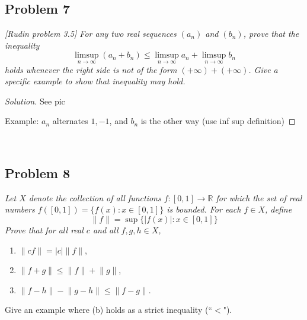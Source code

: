 \documentclass{article}
\newcommand{\R}{{\mathbb R}}
\begin{document}
\subsection*{Problem 7}
{\it [Rudin problem 3.5]
For any two real sequences $(a_n)$ and $(b_n)$, prove that the inequality
\[
	\limsup_{n\to\infty}(a_n + b_n) \leq \limsup_{n\to\infty}a_n + \limsup_{n\to\infty}b_n
\]
holds whenever the right side is not of the form $(+\infty) + (+\infty)$.
Give a specific example to show that inequality may hold.}

\begin{proof}[Solution]\let\qed\relax
	See pic

	Example: $a_n$ alternates $1,-1$, and $b_n$ is the other way (use inf sup definition)
\end{proof}
\clearpage
~\clearpage

\subsection*{Problem 8}
{\it Let $X$ denote the collection of all functions $f \colon [0,1] \to \R$
for which the set of real numbers $f([0,1]) = \{f(x) \colon x \in [0,1]\}$ is bounded.
For each $f \in X$, define
\[
	\lVert f \rVert = \sup\{|f(x)| \colon x \in [0,1]\}
\]
Prove that for all real $c$ and all $f,g,h \in X$,
\begin{enumerate}
	\item $\lVert cf \rVert = |c|\lVert f \rVert$,
	\item $\lVert f + g \rVert \leq \lVert f \rVert + \lVert g \rVert$,
	\item $\lVert f - h \rVert - \lVert g - h\rVert \leq \lVert f - g\rVert$.
\end{enumerate}
Give an example where (b) holds as a strict inequality (``$<$").}
\end{document}
